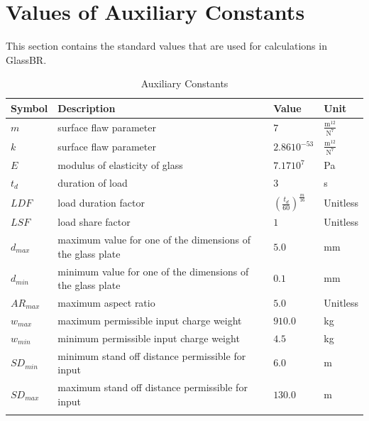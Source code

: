 \documentclass[12pt]{article}
\begin{document}
\section{Values of Auxiliary Constants}
\label{Sec:AuxConstants}
This section contains the standard values that are used for calculations in GlassBR.
\begin{longtabu}{l X[l] l l}
\toprule
Symbol & Description & Value & Unit
\\
\midrule
$m$ & surface flaw parameter & $7$ & $\frac{\text{m}^{12}}{\text{N}^{7}}$
\\
$k$ & surface flaw parameter & $2.86 10^{-53}$ & $\frac{\text{m}^{12}}{\text{N}^{7}}$
\\
$E$ & modulus of elasticity of glass & $7.17 10^{7}$ & Pa
\\
${t_{d}}$ & duration of load & $3$ & s
\\
$LDF$ & load duration factor & $\left(\frac{{t_{d}}}{60}\right)^{\frac{m}{16}}$ & Unitless
\\
$LSF$ & load share factor & $1$ & Unitless
\\
${d_{max}}$ & maximum value for one of the dimensions of the glass plate & $5.0$ & mm
\\
${d_{min}}$ & minimum value for one of the dimensions of the glass plate & $0.1$ & mm
\\
${AR_{max}}$ & maximum aspect ratio & $5.0$ & Unitless
\\
${w_{max}}$ & maximum permissible input charge weight & $910.0$ & kg
\\
${w_{min}}$ & minimum permissible input charge weight & $4.5$ & kg
\\
${SD_{min}}$ & minimum stand off distance permissible for input & $6.0$ & m
\\
${SD_{max}}$ & maximum stand off distance permissible for input & $130.0$ & m
\\
\bottomrule
\caption{Auxiliary Constants}
\label{Table:TAuxConsts}
\end{longtabu}
\end{document}
